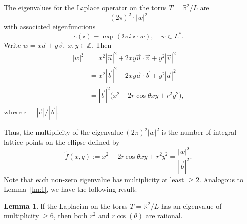 \documentclass[11pt]{amsart}
\theoremstyle{definition}
\newtheorem{lemma}[theorem]{Lemma}
\def\R{{\mathbb R}}
\begin{document}
The eigenvalues for the Laplace operator on the torus $T=\R^2/L$ are 
\[
(2\pi)^2 \cdot |w|^2
\]
with associated eigenfunctions
\[
e(z) = \exp(2\pi i \, z \cdot w), \quad w \in L^*.
\]
Write  \( w = x\vec{u} + y\vec{v}, \; x, y \in \mathbb{Z} \). Then
\begin{align*}
	|w|^2  &= x^2|\vec{u}|^2 + 2xy \vec{u}\cdot\vec{v}+ y^2|\vec{v}|^2 \\
	&= x^2|\vec{b}|^2 - 2xy\vec{a}\cdot\vec{b}+ y^2|\vec{a}|^2 \\
	&= |\vec{b}|^2 \bigl( x^2 - 2r \cos \theta xy+ r^2 y^2\bigr),
\end{align*}
where \( r = |\vec{a}|/|\vec{b}|\).

Thus, the multiplicity of the eigenvalue \( (2\pi)^2 |w|^2 \) is the number of integral lattice points on the ellipse defined by
\begin{equation}\label{eq:quadratic}
\tilde f(x, y):=x^2 - 2 r \cos \theta xy + r^2 y^2= \frac{|w|^2}{|\vec{b}|^2}.
\end{equation}
Note that each non‑zero eigenvalue has multiplicity at least \( \geq 2 \). Analogous to Lemma~\ref{lm:1}, we have the following result: 

\begin{lemma}\label{lm:2}
	If the Laplacian on the torus  \( T=\R^2/L \) has an eigenvalue of multiplicity \( \geq 6 \), then both \( r^2 \) and \( r\cos(\theta) \) are rational.
\end{lemma}
\end{document}
